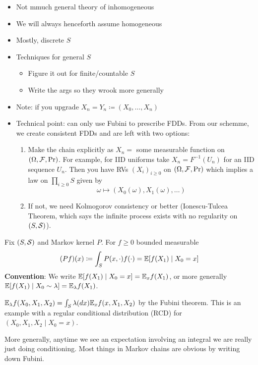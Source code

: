 \begin{itemize}
  \item Not mmuch general theory of inhomogeneous
  \item We will always henceforth assume homogeneous
  \item Mostly, discrete $S$
  \item Techniques for general $S$
    \begin{itemize}
      \item Figure it out for finite/countable $S$
      \item Write the args so they wrook more generally
    \end{itemize}
  \item Note: if you upgrade $X_n = Y_n \coloneqq (X_0, \ldots, X_n)$
  \item Technical point: can only use Fubini to prescribe FDDs.
    From our schemme, we create consistent FDDs and are left with
    two options:
    \begin{enumerate}
      \item Make the chain explicitly as $X_n =$ some measurable
        function on $(\Omega, \mathcal{F}, \Pr)$. For example,
        for IID uniforms take $X_n = F^{-1}(U_n)$ for an
        IID sequence $U_n$. Then you have RVs $(X_i)_{i \geq 0}$
        on $(\Omega, \mathcal{F}, \Pr)$ which implies a law on
        $\prod_{i \geq 0} S$ given by
        \[
          \omega \mapsto (X_0(\omega), X_1(\omega), \ldots)
        \]
      \item If not, we need Kolmogorov consistency
        or better (Ionescu-Tulcea Theorem, which says the
        infinite process exists with no regularity on $(S, \mathcal{S})$).
    \end{enumerate}
\end{itemize}


Fix $(S, \mathcal{S})$ and Markov kernel $P$. For $f \geq 0$ bounded measurable
\[
  (Pf)(x)
  \coloneqq \int_S P(x, \cdot) f(\cdot)
  = \mathbb{E}[ f(X_1) \mid X_0 = x]
\]
\textbf{Convention}: We write $\mathbb{E}[f(X_1) \mid X_0 = x] = \mathbb{E}_x f(X_1)$,
or more generally $\mathbb{E}[f(X_1) \mid X_0 \sim \lambda] = \mathbb{E}_\lambda f(X_1)$.

\begin{example}
  $\mathbb{E}_\lambda f(X_0, X_1, X_2) = \int_S \lambda(dx) \mathbb{E}_x f(x, X_1, X_2)$ by the Fubini theorem.
  This is an example with a regular conditional
  distribution (RCD) for $(X_0, X_1, X_2 \mid X_0 = x)$.

  More generally, anytime we see an expectation involving
  an integral we are really just doing conditioning. Most
  things in Markov chains are obvious by writing down
  Fubini.
\end{example}

